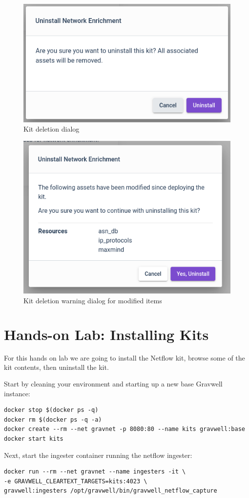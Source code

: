 \begin{figure}[H]
	\includegraphics[width=0.4\linewidth]{images/uninstall-confirm.png}
	\caption{Kit deletion dialog}
	\label{fig:uninstall-confirm}
\end{figure}

\begin{figure}[H]
	\includegraphics[width=0.4\linewidth]{images/uninstall-warn.png}
	\caption{Kit deletion warning dialog for modified items}
	\label{fig:uninstall-warn}
\end{figure}

\section{Hands-on Lab: Installing Kits}

For this hands on lab we are going to install the Netflow kit, browse some of the kit contents, then uninstall the kit.

Start by cleaning your environment and starting up a new base Gravwell
instance:

\begin{Verbatim}[breaklines=true]
docker stop $(docker ps -q)
docker rm $(docker ps -q -a)
docker create --rm --net gravnet -p 8080:80 --name kits gravwell:base
docker start kits
\end{Verbatim}

Next, start the ingester container running the netflow ingester:

\begin{Verbatim}[breaklines=true]
docker run --rm --net gravnet --name ingesters -it \
-e GRAVWELL_CLEARTEXT_TARGETS=kits:4023 \
gravwell:ingesters /opt/gravwell/bin/gravwell_netflow_capture
\end{Verbatim}


